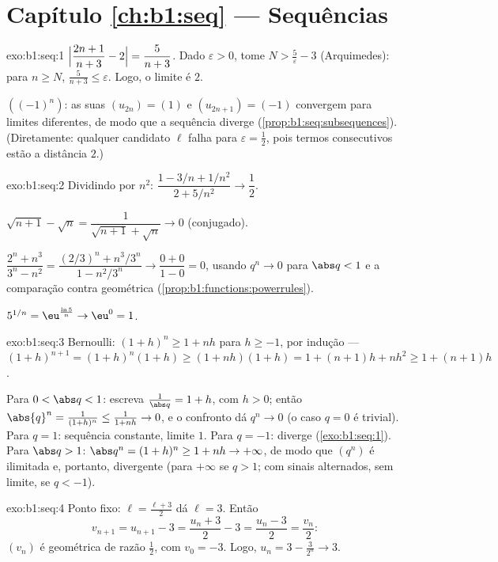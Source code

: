 \section*{Capítulo \ref{ch:b1:seq} --- Sequências}

\begin{solution}{exo:b1:seq:1}
$\Bigl|\dfrac{2n+1}{n+3} - 2\Bigr| = \dfrac{5}{n+3}$. Dado
$\varepsilon > 0$, tome $N > \frac 5\varepsilon - 3$ (Arquimedes):
para $n \geq N$, $\frac{5}{n+3} \leq \varepsilon$. Logo, o limite é
$2$.

$((-1)^n)$: as suas  $(u_{2n}) = (1)$ e $(u_{2n+1}) =
(-1)$ convergem para limites diferentes, de modo que a sequência
diverge (\cref{prop:b1:seq:subsequences}). (Diretamente: qualquer candidato $\ell$
falha para $\varepsilon = \frac12$, pois termos consecutivos estão a
distância $2$.)
\end{solution}

\begin{solution}{exo:b1:seq:2}
Dividindo por $n^2$: $\dfrac{1 - 3/n + 1/n^2}{2 + 5/n^2} \to
\dfrac12$.

$\sqrt{n+1} - \sqrt n = \dfrac{1}{\sqrt{n+1} + \sqrt n} \to 0$
(conjugado).

$\dfrac{2^n + n^3}{3^n - n^2} = \dfrac{(2/3)^n + n^3/3^n}{1 -
n^2/3^n} \to \dfrac{0 + 0}{1 - 0} = 0$, usando $q^n \to 0$ para $\abs q
< 1$ e a comparação  contra geométrica
(\cref{prop:b1:functions:powerrules}).

$5^{1/n} = \eu^{\frac{\ln 5}{n}} \to \eu^0 = 1$.
\end{solution}

\begin{solution}{exo:b1:seq:3}
Bernoulli: $(1+h)^n \geq 1 + nh$ para $h \geq -1$, por indução ---
$(1+h)^{n+1} = (1+h)^n(1+h) \geq (1+nh)(1+h) = 1 + (n+1)h + nh^2
\geq 1 + (n+1)h$.

Para $0 < \abs q < 1$: escreva $\frac{1}{\abs q} = 1 + h$, com $h > 0$; então
$\abs{q}^n = \frac{1}{(1+h)^n} \leq \frac{1}{1 + nh} \to 0$, e o
confronto dá $q^n \to 0$ (o caso $q = 0$ é trivial). Para $q = 1$:
sequência constante, limite $1$. Para $q = -1$: diverge
(\cref{exo:b1:seq:1}). Para $\abs q > 1$: $\abs q^n = (1 + h)^n \geq
1 + nh \to +\infty$, de modo que $(q^n)$ é ilimitada e, portanto, divergente (para
$+\infty$ se $q > 1$; com sinais alternados, sem limite, se $q <
-1$).
\end{solution}

\begin{solution}{exo:b1:seq:4}
Ponto fixo: $\ell = \frac{\ell + 3}{2}$ dá $\ell = 3$. Então
\[
v_{n+1} = u_{n+1} - 3 = \frac{u_n + 3}{2} - 3 = \frac{u_n - 3}{2} =
\frac{v_n}{2}:
\]
$(v_n)$ é geométrica de razão $\frac12$, com $v_0 = -3$. Logo, $u_n = 3 -
\frac{3}{2^n} \to 3$.
\end{solution}

